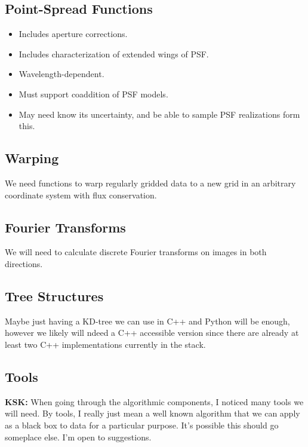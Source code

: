 \subsection{Point-Spread Functions}
\label{sec:spPSF}

\begin{itemize}
\item Includes aperture corrections.
\item Includes characterization of extended wings of PSF.
\item Wavelength-dependent.
\item Must support coaddition of PSF models.
\item May need know its uncertainty, and be able to sample PSF realizations form this.
\end{itemize}

\subsection{Warping}
\label{sec:spWarp}

We need functions to warp regularly gridded data to a new grid in an arbitrary coordinate system with flux conservation.

\subsection{Fourier Transforms}
\label{sec:spFourier}

We will need to calculate discrete Fourier transforms on images in both directions.

\subsection{Tree Structures}
\label{sec:spTrees}
Maybe just having a KD-tree we can use in C++ and Python will be enough, however we likely will ndeed a C++ accessible version since there are already at least two C++ implementations currently in the stack.

\subsection{Tools}
\label{sec:spTools}

{\bf KSK:} When going through the algorithmic components, I noticed many tools we will need.  By tools, I really just mean a well known algorithm that we can apply as a black box to data for a particular purpose. It's possible this should go someplace else.  I'm open to suggestions.

